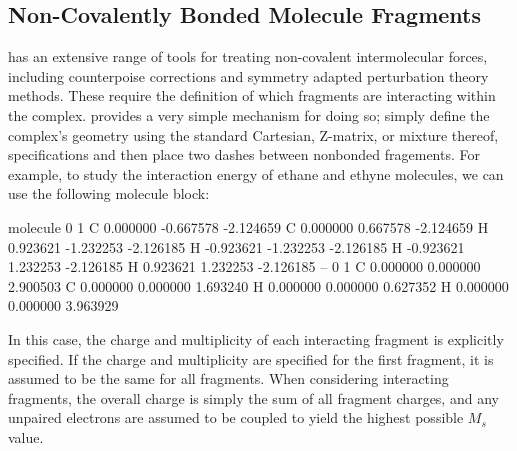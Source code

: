 \subsection{Non-Covalently Bonded Molecule Fragments}

\PSIfour has an extensive range of tools for treating non-covalent
intermolecular forces, including counterpoise corrections and symmetry adapted
perturbation theory methods. These require the definition of which fragments
are interacting within the complex. \PSIfour provides a very simple mechanism
for doing so; simply define the complex's geometry using the standard
Cartesian, Z-matrix, or mixture thereof, specifications and then place two
dashes between nonbonded fragements. For example, to study the interaction
energy of ethane and ethyne molecules, we can use the following molecule
block:
\begin{Snippet}
molecule{
  0 1
  C  0.000000 -0.667578  -2.124659
  C  0.000000  0.667578  -2.124659
  H  0.923621 -1.232253  -2.126185
  H -0.923621 -1.232253  -2.126185
  H -0.923621  1.232253  -2.126185
  H  0.923621  1.232253  -2.126185
  --
  0 1
  C 0.000000 0.000000 2.900503
  C 0.000000 0.000000 1.693240 
  H 0.000000 0.000000 0.627352
  H 0.000000 0.000000 3.963929
}
\end{Snippet}
In this case, the charge and multiplicity of each interacting fragment is
explicitly specified. If the charge and multiplicity are specified for the
first fragment, it is assumed to be the same for all fragments. When
considering interacting fragments, the overall charge is simply the sum of all
fragment charges, and any unpaired electrons are assumed to be coupled to
yield the highest possible $M_s$ value.

